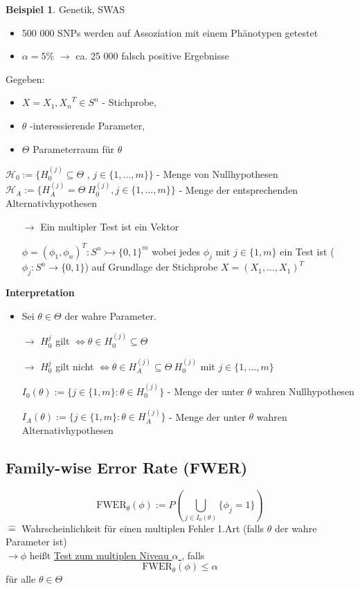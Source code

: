 \documentclass[10pt]{report}
\theoremstyle{definition}
\newtheorem{exmp}{Beispiel}
\begin{document}
\begin{exmp}
	Genetik, SWAS
	\begin{itemize}
		\item 500 000 SNPs werden auf Assoziation mit einem Phänotypen getestet
		\item $\alpha = 5\%$ $\rightarrow$ ca. 25 000 falsch positive Ergebnisse
	\end{itemize}
\end{exmp}
\newpage
Gegeben:
\begin{itemize}
	\item $X= {X_1, X_n}^T \in S^n$ - Stichprobe,
	\item $\theta$ -interessierende Parameter,
	\item $\Theta$ Parameterraum für $\theta$
\end{itemize}
$\mathcal{H}_0 := \{ H_0^{(j)} \subseteq \Theta$ , $j \in \{1, \ldots, m\} \}$ - Menge von Nullhypothesen\\
$\mathcal{H}_A := \{ H_A^(j) = \Theta \ H_0^{(j)} , j \in \{1, \ldots, m\}\}$ - Menge der entsprechenden Alternativhypothesen
\begin{itemize}
	\item[$\rightarrow$] Ein multipler Test ist ein Vektor 
	\item[]$\phi = (\phi_1, \phi_n)^T: S^n \rightarrowtail \{0,1\}^m$ 
wobei jedes $\phi_j$ mit $j \in \{1,m\}$ ein Test ist ($\phi_j: S^n \rightarrow \{0,1\}$) auf Grundlage der Stichprobe $X = (X_1,\ldots, X_1)^T$
\end{itemize}
\textbf{Interpretation}
\begin{itemize}
	\item Sei $\theta \in \Theta$ der wahre Parameter.
	\item[$\rightarrow$] $H_0^{j}$  gilt $\Leftrightarrow \theta \in H_0^{(j)} \subseteq \Theta$
	\item[$\rightarrow$] $H_0^{j}$ gilt nicht $\Leftrightarrow \theta \in H_A^{(j)} \subseteq \Theta \ H_0^{(j)} $
mit $j \in \{1,\ldots,m\}$
	\item[]$I_0(\theta) := \{j \in \{1,m\} : \theta \in H_0^{(j)} \}$ - Menge der unter $\theta$ wahren Nullhypothesen
	\item[]$I_A(\theta) := \{j \in \{1,m\} : \theta \in H_A^{(j)} \}$ - Menge der unter $\theta$ wahren Alternativhypothesen
\end{itemize}


\subsection{Family-wise Error Rate (FWER) }
\[ \text{FWER}_{\theta}(\phi)  := P \left( \bigcup_{j\in I_{0}(\theta)} \{ \phi_j = 1\} \right) \]
$\mathrel{\widehat{=}}$ Wahrscheinlichkeit für einen multiplen Fehler 1.Art (falls $\theta$ der wahre Parameter ist) \\
$\rightarrow \phi$ heißt \underline{Test zum multiplen Niveau $\alpha$ }, falls
\[ \text{FWER}_{\theta}(\phi) \leq \alpha \]
für alle $\theta \in \Theta $
\end{document}
